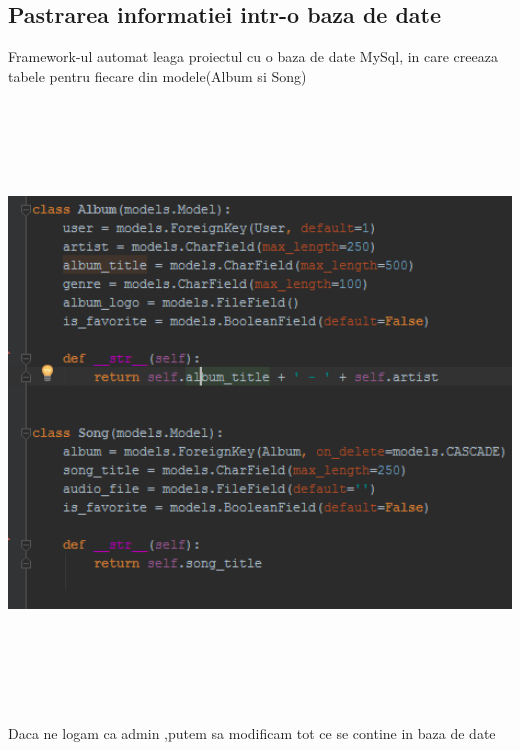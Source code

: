 \documentclass[a4paper, 12pt]{article}
\begin{document}
\subsection{Pastrarea informatiei intr-o baza de date}
Framework-ul automat leaga proiectul cu o baza de date MySql,
in care creeaza tabele pentru fiecare din modele(Album si Song)

\includegraphics*[width=15cm, height=16cm]{model}

Daca ne logam ca admin ,putem sa modificam tot ce se contine in baza de date 
\end{document}
